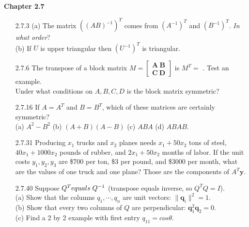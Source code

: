 \documentclass[10pt,twoside,reqno]{article}
\begin{document}
\vspace{5mm}
\textbf{Chapter 2.7}
\begin{enumerate}
\item[2.7.3] (a) The matrix $((AB)^{-1})^T$ comes from $(A^{-1})^T$ and $(B^{-1})^T$. \textit{In what order}?\\
(b) If $U$ is upper triangular then $(U^{-1})^T$ is \underline{\hspace{6mm}} triangular.\\
\item[2.7.6] The transpose of a block matrix $M = \left[\begin{smallmatrix} \pmb{A}\ \pmb{B} \\ \pmb{C}\ \pmb{D} \end{smallmatrix} \right]$ is $M^T =$ \underline{\hspace{6mm}}. Test an example.\\
Under what conditions on $A, B, C, D$ is the block matrix symmetric?\\
\item[2.7.16] If $A = A^{T}$ and $B = B^{T}$, which of these matrices are certainly symmetric?\\
(a) $A^2 - B^2$ \hspace{10mm} (b) $(A + B)(A - B)$ \hspace{10mm} (c) $ABA$ \hspace{10mm} (d) $ABAB$.\\
\item[2.7.31] Producing $x_1$ trucks and $x_2$ planes needs $ x_1 + 50x_2$ tons of steel, $40x_1 + 1000x_2$ pounds of rubber, and $2x_1 + 50x_2$ months of labor. If the unit costs $y_1, y_2, y_3$ are \$700 per ton, \$3 per pound, and \$3000 per month, what are the values of one truck and one plane? Those are the components of $A^T\pmb{y}$.\\
\item[2.7.40] Suppose $Q^T equals \hspace{1mm} Q^{-1}$ (transpose equals inverse, so $Q^TQ = I$).\\
(a) Show that the columns $q_1, \cdots, q_n$ are unit vectors: $\lVert \pmb{q}_i \rVert^2 = 1$.\\
(b) Show that every two columns of $Q$ are perpendicular: $\pmb{q}_1^2\pmb{q}_2 = 0$.\\
(c) Find a 2 by 2 example with first entry $q_{11} = cos\theta$.\\
\end{enumerate}
\end{document}
